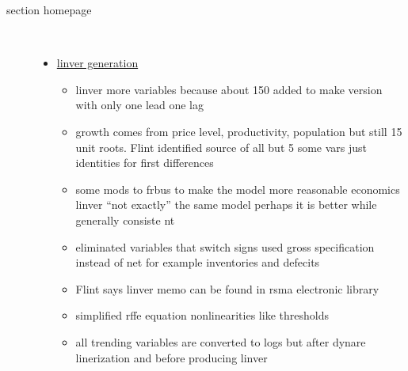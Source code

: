 \documentclass[12pt]{article}
\begin{document}
\begin{description}
\item[section homepage] \ 
  \begin{itemize}
  \item \href{/mq/home/develop/frbus/models/develop/linver/aareadme}{linver generation }
    \begin{itemize}
    \item linver more variables because about 150 added to make version with only one lead one lag
    \item growth comes from price level, productivity, population but still 15 unit roots.  Flint identified source of all but  5 some vars just identities for first differences
    \item some mods to frbus to make the model more reasonable economics linver ``not exactly'' the same model perhaps it is better while generally consiste nt
    \item eliminated variables that switch signs used gross specification instead of net for example inventories and defecits
    \item Flint says linver memo can be found in rsma electronic library
    \item simplified rffe equation nonlinearities like thresholds
    \item all trending variables are converted to logs but after dynare linerization and before producing linver
    \end{itemize}


\end{itemize}
\end{description}
\end{document}
